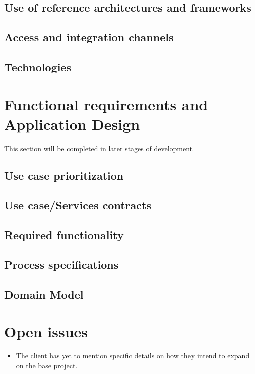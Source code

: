 \documentclass[a4paper,12pt]{report}
\begin{document}
	\subsection{Use of reference architectures and frameworks}
	\subsection{Access and integration channels}
	\subsection{Technologies}
\section{Functional requirements and Application Design}
	This section will be completed in later stages of development
	\subsection{Use case prioritization}
	\subsection{Use case/Services contracts}
	\subsection{Required functionality}
	\subsection{Process specifications}
	\subsection{Domain Model}

\section{Open issues}
	\begin{itemize}
		\item The client has yet to mention specific details on how they intend to expand on the base project.
	\end{itemize}




\end{document}
